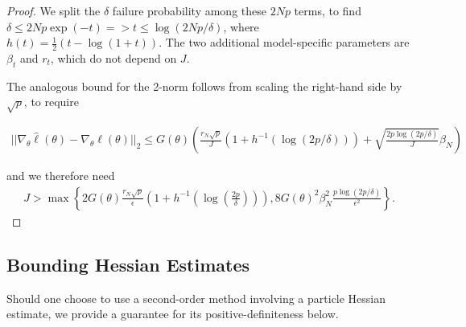 \begin{proof}
We split the $\delta$ failure probability among these $2Np$ terms, to find $\delta\leq2Np\exp(-t) => t\leq\log(2Np/\delta)$, where $h(t) = \frac{1}{2}(t - \log(1+t))$. The two additional model-specific parameters are $\beta_t$ and $r_t$, which do not depend on $J$. 

The analogous bound for the 2-norm follows from scaling the right-hand side by $\sqrt{p}$, to require 

\begin{align}
    ||\nabla_\theta \hat\ell(\theta) - \nabla_\theta \ell(\theta)||_2 \leq G(\theta)\left(\frac{r_N\sqrt{p}}{J}(1+h^{-1}(\log(2p/\delta))) + \sqrt{\frac{2p\log(2p/\delta)}{J}}\beta_N\right)
\end{align}

and we therefore need 
\begin{align}
    J > \max\left\{2G(\theta)\frac{r_N\sqrt{p}}{\epsilon}\left(1+h^{-1}\left(\log\left(\frac{2p}{\delta}\right)\right)\right), 8G(\theta)^2\beta_N^2\frac{p\log(2p/\delta)}{\epsilon^2}\right\}.
\end{align}

\end{proof}


\subsection{Bounding Hessian Estimates}

Should one choose to use a second-order method involving a particle Hessian estimate, we provide a guarantee for its positive-definiteness below.

